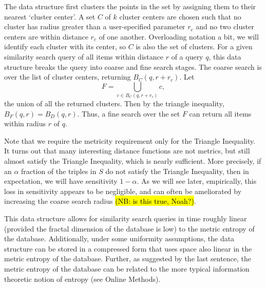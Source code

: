 \documentclass[review,preprint,12pt]{elsarticle}
\theoremstyle{definition}
\theoremstyle{remark}
\numberwithin{equation}{section}
\begin{document}
The data structure first clusters the points in the set by assigning them to their nearest `cluster center'.
A set $C$ of $k$ cluster centers are chosen such that no cluster has radius greater than a user-specified parameter $r_c$ and no two cluster centers are within distance $r_c$ of one another.
Overloading notation a bit, we will identify each cluster with its center, so $C$ is also the set of clusters.
For a given similarity search query of all items within distance $r$ of a query $q$, this data structure breaks the query into coarse and fine search stages.
The coarse search is over the list of cluster centers, returning $B_C(q,r + r_c)$.
Let \[\displaystyle F = \bigcup_{c \in B_C(q,r+r_c)} c , \] the union of all the returned clusters.
Then by the triangle inequality, $B_F(q,r) = B_D(q,r)$.
Thus, a fine search over the set $F$ can return all items within radius $r$ of $q$.

Note that we require the metricity requirement only for the Triangle Inequality.
It turns out that many interesting distance functions are not metrics, but still almost satisfy the Triangle Inequality, which is nearly sufficient.
More precisely, if an $\alpha$ fraction of the triples in $S$ do not satisfy the Triangle Inequality, then in expectation, we will have sensitivity $1 - \alpha$.
As we will see later, empirically, this loss in sensitivity appears to be negligible, and can often be ameliorated by increasing the coarse search radius \hl{(NB: is this true, Noah?)}.

This data structure allows for similarity search queries in time roughly linear (provided the fractal dimension of the database is low) to the metric entropy of the database.
Additionally, under some uniformity assumptions, the data structure can be stored in a compressed form that uses space also linear in the metric entropy of the database.
Further, as suggested by the last sentence, the metric entropy of the database can be related to the more typical information theoretic notion of entropy (see Online Methods).
\end{document}
